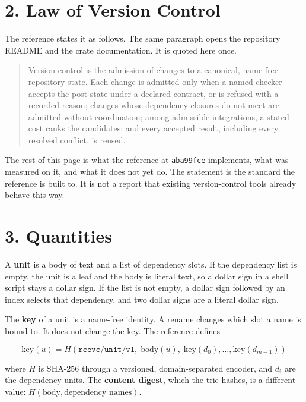 \documentclass[10pt,letterpaper]{article}
\begin{document}
\section{2. Law of Version Control}\label{law-of-version-control}

The reference states it as follows. The same paragraph opens the
repository README and the crate documentation. It is quoted here once.

\begin{quote}
Version control is the admission of changes to a canonical, name-free
repository state. Each change is admitted only when a named checker
accepts the post-state under a declared contract, or is refused with a
recorded reason; changes whose dependency closures do not meet are
admitted without coordination; among admissible integrations, a stated
cost ranks the candidates; and every accepted result, including every
resolved conflict, is reused.
\end{quote}

The rest of this page is what the reference at \texttt{aba99fce}
implements, what was measured on it, and what it does not yet do. The
statement is the standard the reference is built to. It is not a report
that existing version-control tools already behave this way.

\section{3. Quantities}\label{quantities}

A \textbf{unit} is a body of text and a list of dependency slots. If the
dependency list is empty, the unit is a leaf and the body is literal
text, so a dollar sign in a shell script stays a dollar sign. If the
list is not empty, a dollar sign followed by an index selects that
dependency, and two dollar signs are a literal dollar sign.

The \textbf{key} of a unit is a name-free identity. A rename changes
which slot a name is bound to. It does not change the key. The reference
defines

\[\mathrm{key}(u) = H(\texttt{rcevc/unit/v1},\; \mathrm{body}(u),\; \mathrm{key}(d_0), \ldots, \mathrm{key}(d_{m-1}))\]

where \(H\) is SHA-256 through a versioned, domain-separated encoder,
and \(d_i\) are the dependency units. The \textbf{content digest}, which
the trie hashes, is a different value:
\(H(\mathrm{body}, \text{dependency names})\).
\end{document}
